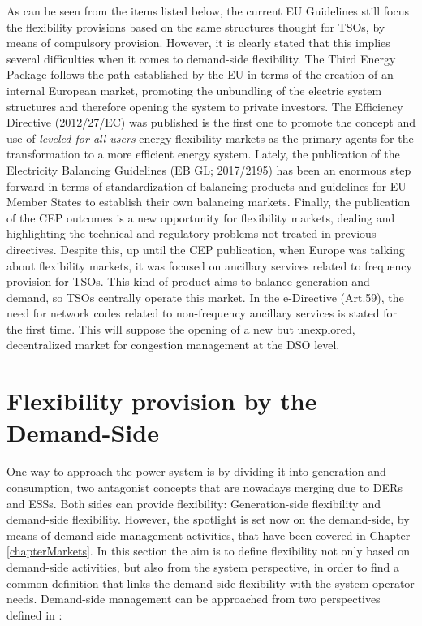 As can be seen from the items listed below, the current EU Guidelines still focus the flexibility provisions based on the same structures thought for TSOs, by means of compulsory provision. However, it is clearly stated that this implies several difficulties when it comes to demand-side flexibility.
The Third Energy Package follows the path established by the EU in terms of the creation of an internal European market, promoting the unbundling of the electric system structures and therefore opening the system to private investors. The Efficiency Directive (2012/27/EC) was published is the first one to promote the concept and use of \textit{leveled-for-all-users} energy flexibility markets as the primary agents for the transformation to a more efficient energy system. Lately, the publication of the Electricity Balancing Guidelines (EB GL; 2017/2195) has been an enormous step forward in terms of standardization of balancing products and guidelines for EU-Member States to establish their own balancing markets. Finally, the publication of the CEP \cite{validzic2017clean} outcomes is a new opportunity for flexibility markets, dealing and highlighting the technical and regulatory problems not treated in previous directives. 
Despite this, up until the CEP publication, when Europe was talking about flexibility markets, it was focused on ancillary services related to frequency provision for TSOs. This kind of product aims to balance generation and demand, so TSOs centrally operate this market. In the e-Directive (Art.59), the need for network codes related to non-frequency ancillary services is stated for the first time. This will suppose the opening of a new but unexplored, decentralized market for congestion management at the DSO level.


\section{Flexibility provision by the Demand-Side} \label{sec:FlexibilityProvision}

One way to approach the power system is by dividing it into generation and consumption, two antagonist concepts that are nowadays merging due to DERs and ESSs. Both sides can provide flexibility: Generation-side flexibility and demand-side flexibility. However, the spotlight is set now on the demand-side, by means of demand-side management activities, that have been covered in Chapter \ref{chapterMarkets}. In this section the aim is to define flexibility not only based on demand-side activities, but also from the system perspective, in order to find a common definition that links the demand-side flexibility with the system operator needs. Demand-side management can be approached from two perspectives defined in \cite{USEF2018}:

